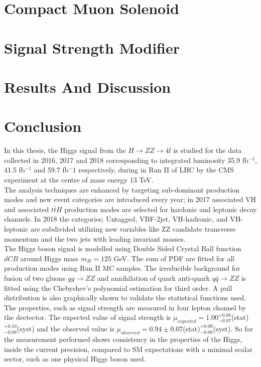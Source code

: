 \documentclass[12pt]{report}
\begin{document}
\chapter{Compact Muon Solenoid}


\chapter{Signal Strength Modifier}


\chapter{Results And Discussion}


\chapter*{Conclusion}
\vspace{-8mm}
\hspace{5mm} In this thesis, the Higgs signal from the $H \rightarrow ZZ \rightarrow 4l$ is studied for the data collected in 2016, 2017 and 2018 corresponding to integrated luminosity 35.9 fb$^{-1}$, 41.5 fb$^{-1}$ and 59.7 fb$^-1$ respectively, during in Run II of LHC by the CMS experiment at the centre of mass energy 13 TeV.\\

The analysis techniques are enhanced by targeting sub-dominant production modes and new event categories are introduced every year; in 2017 associated VH and associated $t\bar{t}H$ production modes are selected for hardonic and leptonic decay channels. In 2018 the categories; Untagged, VBF-2jet, VH-hadronic, and VH-leptonic are subdivided utilizing new variables like ZZ candidate transverse momentum and the two jets with leading invariant masses.\\

The Higgs boson signal is modelled using Double Sided Crystal Ball function $dCB$ around Higgs mass $m_H = 125$ GeV. The sum of PDF are fitted for all production modes using Run II MC samples. The irreducible background for fusion of two gluons $gg \rightarrow ZZ$ and annihilation of quark anti-quark $q\bar{q} \rightarrow ZZ$ is fitted using the Chebyshev's polynomial estimation for third order. A pull distribution is also graphically shown to validate the statistical functions used.\\

The properties, such as signal strength are measured in four lepton channel by the dectector. The expected value of signal strength is $\mu_{expected} = 1.00^{+0.08}_{-0.07}$(stat)$^{+0.10}_{-0.08}$(syst) and the observed value is $\mu_{observed} = 0.94\pm0.07$(stat)$^{+0.09}_{-0.08}$(syst). So far the measurement performed shows consistency in the properties of the Higgs, inside the current precision, compared to SM expectations with a minimal scalar sector, such as one physical Higgs boson used.\\
\end{document}

